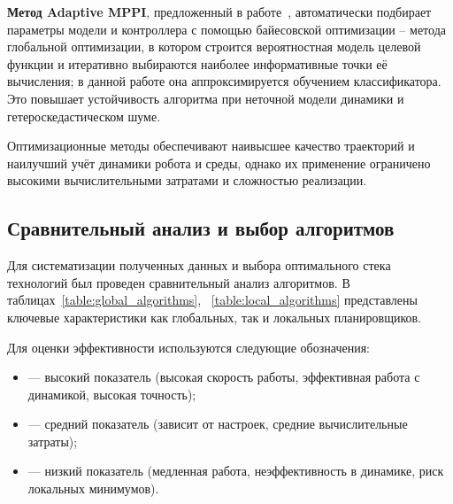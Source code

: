 \documentclass[a4paper,12pt]{extarticle}
\begin{document}
    \textbf{Метод Adaptive MPPI}, предложенный в работе~\cite{adaptive_mppi}, автоматически подбирает параметры модели и контроллера с помощью байесовской оптимизации -- метода глобальной оптимизации, в котором строится вероятностная модель целевой функции и итеративно выбираются наиболее информативные точки её вычисления; в данной работе она аппроксимируется обучением классификатора.
    Это повышает устойчивость алгоритма при неточной модели динамики и гетероскедастическом шуме.

    Оптимизационные методы обеспечивают наивысшее качество траекторий и наилучший учёт динамики робота и среды,
    однако их применение ограничено высокими вычислительными затратами и сложностью реализации.



    \subsection{Сравнительный анализ и выбор алгоритмов}

    Для систематизации полученных данных и выбора оптимального стека технологий был проведен сравнительный анализ алгоритмов.
    В таблицах~\ref{table:global_algorithms}, ~\ref{table:local_algorithms} представлены ключевые характеристики как глобальных,
    так и локальных планировщиков.

    Для оценки эффективности используются следующие обозначения:
    \begin{itemize}
        \item[«$+$»] — высокий показатель (высокая скорость работы, эффективная работа с динамикой, высокая точность);
        \item[«$+-$»] — средний показатель (зависит от настроек, средние вычислительные затраты);
        \item[«$-$»] — низкий показатель (медленная работа, неэффективность в динамике, риск локальных минимумов).
    \end{itemize}
\end{document}
